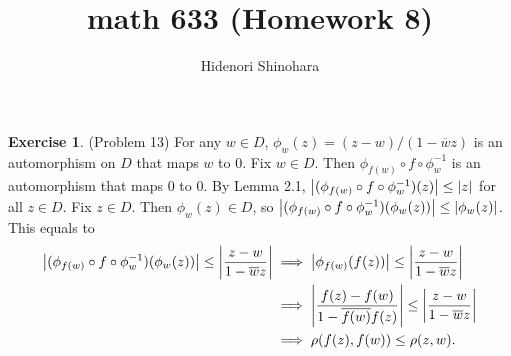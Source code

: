 \documentclass[12pt, psamsfonts]{amsart}
\theoremstyle{definition}
\newtheorem*{exer}{Exercise}
\theoremstyle{remark}
\numberwithin{equation}{section}
\begin{document}
\title{math 633 (Homework 8)}
\author{Hidenori Shinohara}
\maketitle

\begin{exer}{(Problem 13)}
  For any $w \in D$, $\phi_w(z) = (z - w) / (1 - \overline{w}z)$ is an automorphism on $D$ that maps $w$ to $0$.
  Fix $w \in D$.
  Then $\phi_{f(w)} \circ f \circ \phi_w^{-1}$ is an automorphism that maps 0 to 0.
  By Lemma 2.1, $\abs{(\phi_{f(w)} \circ f \circ \phi_w^{-1})(z)} \leq \abs{z}$ for all $z \in D$.
  Fix $z \in D$.
  Then $\phi_w(z) \in D$, so $\abs{(\phi_{f(w)} \circ f \circ \phi_w^{-1})(\phi_w(z))} \leq \abs{\phi_w(z)}$.
  This equals to
  \begin{align*}
    \abs{(\phi_{f(w)} \circ f \circ \phi_w^{-1})(\phi_w(z))} \leq \abs{\frac{z - w}{1 - \overline{w}z}}
      &\implies \abs{\phi_{f(w)}(f(z))} \leq \abs{\frac{z - w}{1 - \overline{w}z}} \\
      &\implies \abs{\frac{f(z) - f(w)}{1 - \overline{f(w)}f(z)}} \leq \abs{\frac{z - w}{1 - \overline{w}z}} \\
      &\implies \rho(f(z), f(w)) \leq \rho(z, w).
  \end{align*}
\end{exer}
\end{document}
